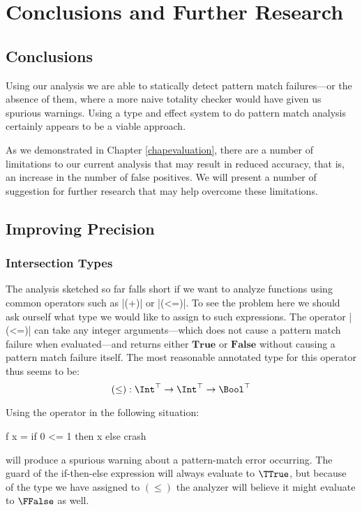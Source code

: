 \chapter{Conclusions and Further Research}\label{chapfurtherresearch}


\section{Conclusions}

Using our analysis we are able to statically detect pattern match failures---or the absence of them, where a more naive totality checker would have given us spurious warnings. Using a type and effect system to do pattern match analysis certainly appears to be a viable approach.

As we demonstrated in Chapter \ref{chapevaluation}, there are a number of limitations to our current analysis that may result in reduced accuracy, that is, an increase in the number of false positives. We will present a number of suggestion for further research that may help overcome these limitations.

\section{Improving Precision}

\subsection{Intersection Types}

The analysis sketched so far falls short if we want to analyze functions using common operators such as |(+)|  or |(<=)|. To see the problem here we should ask ourself what type we would like to assign to such expressions. The operator |(<=)| can take any integer arguments---which does not cause a pattern match failure when evaluated---and returns either $\mathbf{True}$ or $\mathbf{False}$ without causing a pattern match failure itself. The most reasonable annotated type for this operator thus seems to be: \[ (\leq) : \Int^\top \to \Int^\top \to \Bool^\top\]

Using the operator in the following situation:

\begin{code}
f x = if 0 <= 1 then x else crash
\end{code}

will produce a spurious warning about a pattern-match error occurring. The guard of the if-then-else expression will always evaluate to $\TTrue$, but because of the type we have assigned to $(\leq)$ the analyzer will believe it might evaluate to $\FFalse$ as well.

